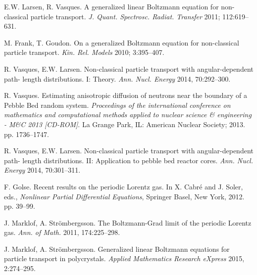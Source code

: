 \documentclass[preprint,12pt]{elsarticle}
\begin{document}
\begin{thebibliography}{00}

\begin{small}

E.W. Larsen, R. Vasques. A generalized linear Boltzmann equation for non-classical particle transport. \textit{J. Quant. Spectrosc. Radiat. Transfer} 2011; 112:619--631.\vspace{-8pt}

M. Frank, T. Goudon. On a generalized Boltzmann equation for non-classical particle transport. \textit{Kin. Rel. Models} 2010; 3:395--407.\vspace{-8pt}

R. Vasques, E.W. Larsen. Non-classical particle transport with angular-dependent path- length distributions. I: Theory. \textit{Ann. Nucl. Energy} 2014, 70:292--300.\vspace{-8pt}

R. Vasques. Estimating anisotropic diffusion of neutrons near the boundary of a Pebble Bed random system. \textit{Proceedings of the international conference on mathematics and computational methods applied to nuclear science \& engineering - M\&C 2013 [CD-ROM]}. La Grange Park, IL: American Nuclear Society; 2013. pp. 1736--1747.\vspace{-8pt}

R. Vasques, E.W. Larsen. Non-classical particle transport with angular-dependent path- length distributions. II: Application to pebble bed reactor cores. \textit{Ann. Nucl. Energy} 2014, 70:301--311.\vspace{-8pt}

F. Golse. Recent results on the periodic Lorentz gas. In X. Cabr\' e and J. Soler, eds., \textit{Nonlinear
Partial Differential Equations}, Springer Basel, New York, 2012. pp. 39--99.\vspace{-8pt}

J. Marklof, A. Str\" ombergsson. The Boltzmann-Grad limit of the periodic Lorentz gas.
\textit{Ann. of Math.} 2011, 174:225--298.\vspace{-8pt}

J. Marklof, A. Str\" ombergsson. Generalized linear Boltzmann equations for particle
transport in polycrystals. \textit{Applied Mathematics Research eXpress} 2015, 2:274--295.\vspace{-8pt}


\end{small}
\end{thebibliography}
\end{document}
